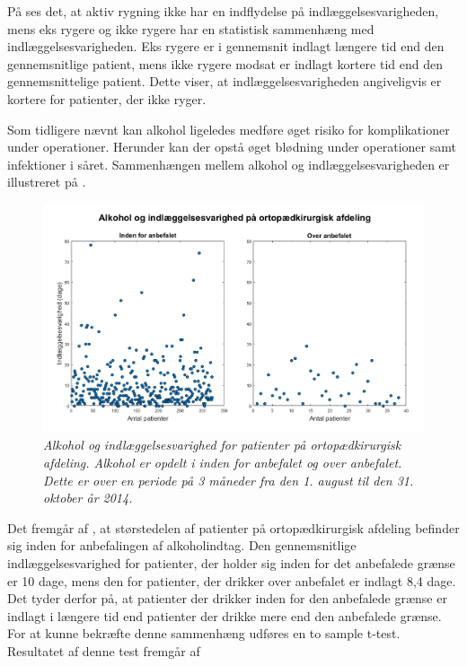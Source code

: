 \noindent
På  ses det, at aktiv rygning ikke har en indflydelse på indlæggelsesvarigheden, mens eks rygere og ikke rygere har en statistisk sammenhæng med indlæggelsesvarigheden. Eks rygere er i gennemsnit indlagt længere tid end den gennemsnitlige patient, mens ikke rygere modsat er indlagt kortere tid end den gennemsnittelige patient. Dette viser, at indlæggelsesvarigheden angiveligvis er kortere for patienter, der ikke ryger. 


Som tidligere nævnt kan alkohol ligeledes medføre øget risiko for komplikationer under operationer. Herunder kan der opstå øget blødning under operationer samt infektioner i såret.\cite{Nordjylland2014} Sammenhængen mellem alkohol og indlæggelsesvarigheden er illustreret på  . 


\begin{figure}[H]
	\centering
	\includegraphics[scale=0.4]{figures/alkohologindlaeg}
	\caption{\textit{Alkohol og indlæggelsesvarighed for patienter på ortopædkirurgisk afdeling. Alkohol er opdelt i inden for anbefalet og over anbefalet. Dette er over en periode på 3 måneder fra den 1. august til den 31. oktober år 2014. }}
	\label{alkohologindlaeggelse}
\end{figure}

\noindent
Det fremgår af , at størstedelen af patienter på ortopædkirurgisk afdeling befinder sig inden for anbefalingen af alkoholindtag. Den gennemsnitlige indlæggelsesvarighed for patienter, der holder sig inden for det anbefalede grænse er 10 dage, mens den for patienter, der drikker over anbefalet er indlagt 8,4 dage. Det tyder derfor på, at patienter der drikker inden for den anbefalede grænse er indlagt i længere tid end patienter der drikke mere end den anbefalede grænse. 
For at kunne bekræfte denne sammenhæng udføres en to sample t-test. Resultatet af denne test fremgår af 



